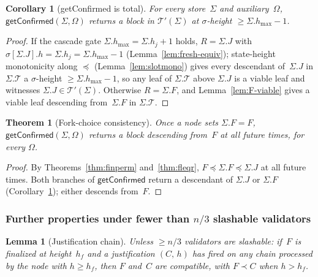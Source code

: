 \ifx\litemode\undefined\documentclass{article}\fi
\newcommand{\T}[0]{\ensuremath{\mathcal{T}}}
\newcommand{\hmax}{\ensuremath{h_{\max}}\xspace}
\newcommand{\viableTree}{\ensuremath{\mathcal{T}'}}
\newcommand{\getConfirmed}{\textsf{getConfirmed}\xspace}
\theoremstyle{plain}
\newtheorem{theorem}{Theorem}
\newtheorem{corollary}{Corollary}
\newtheorem{lemma}{Lemma}
\theoremstyle{definition}
\theoremstyle{remark}
\begin{document}
\begin{corollary}[\getConfirmed is total]\label{cor:getConfirmed-total}
For every store~$\Sigma$ and auxiliary~$\Omega$, $\getConfirmed(\Sigma, \Omega)$ returns a block in $\viableTree(\Sigma)$ at $\sigma$-height $\geq \Sigma.\hmax - 1$.
\end{corollary}

\begin{proof}
If the cascade gate $\Sigma.\hmax = \Sigma.h_j + 1$ holds, $R = \Sigma.J$ with $\sigma[\Sigma.J].h = \Sigma.h_j = \Sigma.\hmax - 1$ (Lemma~\ref{lem:fresh-equiv}); state-height monotonicity along $\preceq$ (Lemma~\ref{lem:slotmono}) gives every descendant of~$\Sigma.J$ in $\Sigma.\T$ a $\sigma$-height $\geq \Sigma.\hmax - 1$, so any leaf of $\Sigma.\T$ above $\Sigma.J$ is a viable leaf and witnesses $\Sigma.J \in \viableTree(\Sigma)$.
Otherwise $R = \Sigma.F$, and Lemma~\ref{lem:F-viable} gives a viable leaf descending from~$\Sigma.F$ in $\Sigma.\T$.
\end{proof}

\begin{theorem}[Fork-choice consistency]\label{thm:fcconsistency}
Once a node sets $\Sigma.F = F$, $\getConfirmed(\Sigma, \Omega)$ returns a block descending from~$F$ at all future times, for every $\Omega$.
\end{theorem}

\begin{proof}
By Theorems~\ref{thm:finperm} and~\ref{thm:fleqr}, $F \preceq \Sigma.F \preceq \Sigma.J$ at all future times.
Both branches of $\getConfirmed$ return a descendant of $\Sigma.J$ or $\Sigma.F$ (Corollary~\ref{cor:getConfirmed-total}); either descends from~$F$.
\end{proof}

\subsubsection*{Further properties under fewer than $n/3$ slashable validators}

\begin{lemma}[Justification chain]\label{lem:certchain}
Unless $\geq n/3$ validators are slashable: if~$F$ is finalized at height~$h_f$ and a justification $(C,\, h)$ has fired on any chain processed by the node with $h \geq h_f$, then $F$ and~$C$ are compatible, with $F \prec C$ when $h > h_f$.
\end{lemma}
\end{document}
